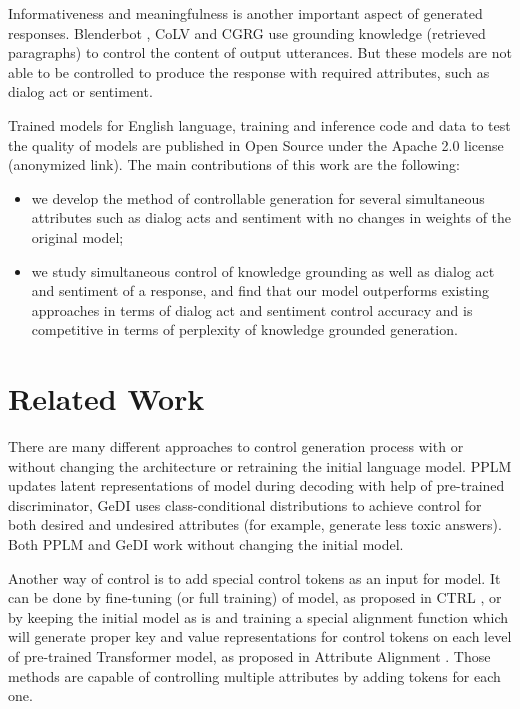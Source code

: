 \documentclass[11pt]{article}
\begin{document}
Informativeness and meaningfulness is another important aspect of generated responses. Blenderbot \cite{roller2020recipes}, CoLV \cite{zhan2021colv} and CGRG \cite{wu2021controllable} use grounding knowledge (retrieved paragraphs) to control the content of output utterances. But these models are not able to be controlled to produce the response with required attributes, such as dialog act or sentiment.

Trained models for English language, training and inference code and data to test the quality of models are published in Open Source under the Apache 2.0 license (anonymized link). The main contributions of this work are the following:
\begin{itemize}
    \item we develop the method of controllable generation for several simultaneous attributes such as dialog acts and sentiment with no changes in weights of the original model;
    \item we study simultaneous control of knowledge grounding as well as dialog act and sentiment of a response, and find that our model outperforms existing approaches in terms of dialog act and sentiment control accuracy and is competitive in terms of perplexity of knowledge grounded generation.
\end{itemize}

\section{Related Work}

There are many different approaches to control generation process with or without changing the architecture or retraining the initial language model. PPLM \cite{pplm} updates latent representations of model during decoding with help of pre-trained discriminator, GeDI \cite{gedi} uses class-conditional distributions to achieve control for both desired and undesired attributes (for example, generate less toxic answers). Both PPLM and GeDI work without changing the initial model. 

Another way of control is to add special control tokens as an input for model. It can be done by fine-tuning (or full training) of model, as proposed in CTRL \cite{ctrl}, or by keeping the initial model as is and training a special alignment function which will generate proper key and value representations for control tokens on each level of pre-trained Transformer model, as proposed in Attribute Alignment \cite{attr_alignment}. Those methods are capable of controlling multiple attributes by adding tokens for each one.
\end{document}
